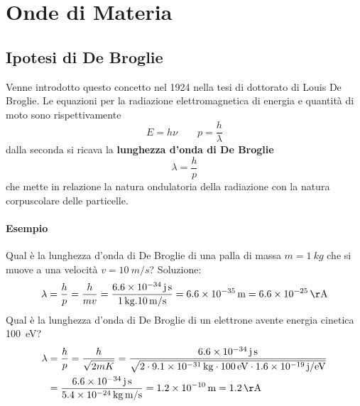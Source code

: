 

\section{Onde di Materia}
\subsection{Ipotesi di De Broglie}
Venne introdotto questo concetto nel 1924 nella tesi di dottorato di Louis De Broglie.
Le equazioni per la radiazione elettromagnetica di energia e quantità di moto sono rispettivamente
\begin{equation}
E = h\nu \quad \quad p = \frac{ h}{\lambda }
\end{equation}
dalla seconda si ricava la \textbf{lunghezza d'onda di De Broglie}
\begin{equation}
\lambda = \frac{ h}{p }
\end{equation}
che mette in relazione la natura ondulatoria della radiazione con la natura corpuscolare delle particelle.

\paragraph{Esempio}
Qual è la lunghezza d'onda di De Broglie di una palla di massa $ m =\SI{1}{kg}$ che si muove a una velocità $v = \SI{10}{m/s}$?
Soluzione:
\begin{equation}
\lambda = \frac{ h}{p } = \frac{ h}{m v } = \frac{ \SI{6.6e-34}{j.s}}{\SI{1}{kg} . \SI{10}{m/s} } = \SI{6.6e-35}{m} = \SI{6.6e-25}{\AA}
\end{equation}
Qual è la lunghezza d'onda di De Broglie di un elettrone avente energia cinetica \SI{100}{eV}?
\begin{equation}
\begin{split}
\lambda & = \frac{ h}{p } = \frac{ h}{\sqrt{2mK} } 
= \frac{\SI{6.6e-34}{j.s} }{\sqrt{ 2 \cdot \SI{9.1e-31}{kg} \cdot \SI{100}{eV} \cdot \SI{1.6e-19}{j / eV} } } \\
& = \frac{ \SI{6.6e-34}{j.s}}{\SI{5.4e-24}{kg.m/s} } = \SI{1.2e-10}{m} = \SI{1.2}{\AA}
\end{split}
\end{equation}

